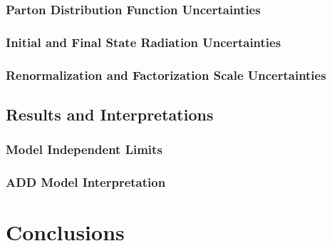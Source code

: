 \documentclass[10pt,twoside,cucitura,classica,english,openany]{toptesi}
\begin{document}


\subsection{Parton Distribution Function Uncertainties}
\label{sec:pdf-uncertainties}



\subsection{Initial and Final State Radiation Uncertainties}
\label{sec:tune-uncertainties}



\subsection{Renormalization and Factorization Scale Uncertainties}
\label{sec:renorm-fact-scale}



\section{Results and Interpretations}
\label{sec:results-interpr}



\subsection{Model Independent Limits}
\label{sec:model-indep-limits-1}



\subsection{ADD Model Interpretation}
\label{sec:add-model-interpr}



\chapter{Conclusions}
\label{cha:conclusions}



\printglossaries

 \printbibliography
\end{document}
